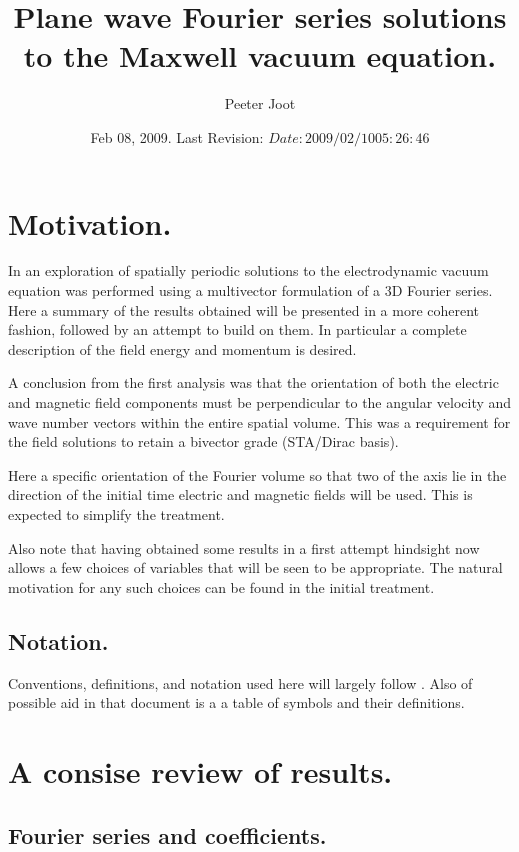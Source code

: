 \documentclass{article}
\title{ Plane wave Fourier series solutions to the Maxwell vacuum equation. }
\author{Peeter Joot}
\date{ Feb 08, 2009.  Last Revision: $Date: 2009/02/10 05:26:46 $ }
\begin{document}
\maketitle{}
\tableofcontents

\section{ Motivation. }

In \cite{PJFourierVacuum} an exploration of spatially periodic solutions to the electrodynamic vacuum equation was performed using a multivector formulation 
of a 3D Fourier series.
Here a summary of the results obtained will be presented in a more
coherent fashion, followed by an attempt to build on them.
In particular a complete
description of the field energy and momentum is desired.

A conclusion from the first analysis was that the
orientation of both the electric and magnetic field components
must be perpendicular to the angular velocity and wave number vectors 
within the entire spatial volume.  This was a requirement for the field
solutions to retain a bivector grade (STA/Dirac basis).

Here a specific orientation of the Fourier volume so that two of the axis
lie in the direction of the initial time electric and magnetic fields will be
used.  This is expected to simplify the treatment.

Also note that having obtained some results in a first attempt hindsight
now allows a few choices of variables that will be seen to be appropriate.
The natural motivation for any such choices can be found in the initial
treatment.

\subsection{ Notation. }

Conventions, definitions, and notation used here will largely follow
\cite{PJFourierVacuum}.  Also of possible aid in that document is a 
a table of symbols and their definitions.

\section{ A consise review of results. }

\subsection{ Fourier series and coefficients. }
\end{document}
